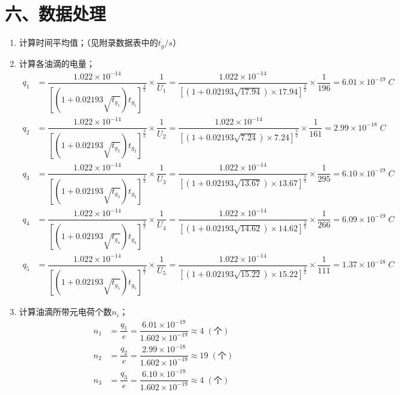 \documentclass[11pt]{article}
\begin{document}
\section*{六、数据处理}

\begin{enumerate}
    \item 计算时间平均值；（见附录数据表中的$\overline{t_g}/s$）
    \item 计算各油滴的电量；
    \begin{align*}
        q_1 &= \dfrac{1.022\times10^{-14}}{\left[\left(1+0.02193\sqrt{t_{g_1}}\right)t_{g_1}\right]^{\frac{3}{2}}}\times\dfrac{1}{U_1} = \dfrac{1.022\times10^{-14}}{\left[\left(1+0.02193\sqrt{17.94}\right)\times17.94\right]^{\frac{3}{2}}}\times\dfrac{1}{196} = 6.01\times10^{-19}\;C \\
        q_2 &= \dfrac{1.022\times10^{-14}}{\left[\left(1+0.02193\sqrt{t_{g_2}}\right)t_{g_2}\right]^{\frac{3}{2}}}\times\dfrac{1}{U_2} = \dfrac{1.022\times10^{-14}}{\left[\left(1+0.02193\sqrt{7.24}\right)\times7.24\right]^{\frac{3}{2}}}\times\dfrac{1}{161} = 2.99\times10^{-18}\;C \\
        q_3 &= \dfrac{1.022\times10^{-14}}{\left[\left(1+0.02193\sqrt{t_{g_3}}\right)t_{g_3}\right]^{\frac{3}{2}}}\times\dfrac{1}{U_3} = \dfrac{1.022\times10^{-14}}{\left[\left(1+0.02193\sqrt{13.67}\right)\times13.67\right]^{\frac{3}{2}}}\times\dfrac{1}{295} = 6.10\times10^{-19}\;C \\
        q_4 &= \dfrac{1.022\times10^{-14}}{\left[\left(1+0.02193\sqrt{t_{g_4}}\right)t_{g_4}\right]^{\frac{3}{2}}}\times\dfrac{1}{U_4} = \dfrac{1.022\times10^{-14}}{\left[\left(1+0.02193\sqrt{14.62}\right)\times14.62\right]^{\frac{3}{2}}}\times\dfrac{1}{266} = 6.09\times10^{-19}\;C \\
        q_5 &= \dfrac{1.022\times10^{-14}}{\left[\left(1+0.02193\sqrt{t_{g_5}}\right)t_{g_5}\right]^{\frac{3}{2}}}\times\dfrac{1}{U_5} = \dfrac{1.022\times10^{-14}}{\left[\left(1+0.02193\sqrt{15.22}\right)\times15.22\right]^{\frac{3}{2}}}\times\dfrac{1}{111} = 1.37\times10^{-18}\;C
    \end{align*}
    \item 计算油滴所带元电荷个数$n_i$；
    \begin{align*}
        n_1&=\dfrac{q_1}{e}=\dfrac{6.01\times10^{-19}}{1.602\times10^{-19}}\approx4\;(\text{个}) \\
        n_2&=\dfrac{q_2}{e}=\dfrac{2.99\times10^{-18}}{1.602\times10^{-19}}\approx19\;(\text{个}) \\
        n_3&=\dfrac{q_3}{e}=\dfrac{6.10\times10^{-19}}{1.602\times10^{-19}}\approx4\;(\text{个}) \\

\end{align*}
\end{enumerate}
\end{document}
